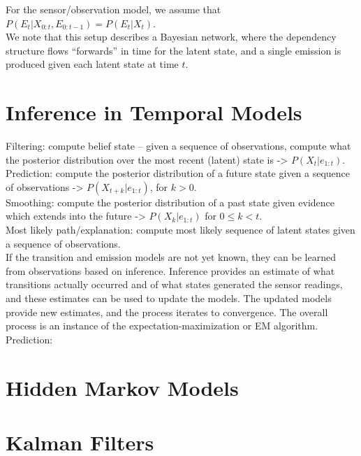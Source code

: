 \documentclass{article}
\begin{document}
\noindent For the sensor/observation model, we assume that $P(E_{t} | X_{0:t}, E_{0:t-1}) = P(E_{t} | X_{t})$.\\

\noindent We note that this setup describes a Bayesian network, where the dependency structure flows
``forwards'' in time for the latent state, and a single emission is produced given each latent state at time $t$.

\section*{Inference in Temporal Models}
Filtering: compute belief state -- given a sequence of observations, compute what the posterior distribution
over the most recent (latent) state is -> $P(X_{t} | e_{1:t})$.\\

\noindent Prediction: compute the posterior distribution of a future state given a sequence of observations ->
$P(X_{t+k} | e_{1:t})$, for $k > 0$.\\

\noindent Smoothing: compute the posterior distribution of a past state given evidence which extends into the future ->
$P(X_{k} | e_{1:t})$ for $0 \leq k < t$.\\

\noindent Most likely path/explanation: compute most likely sequence of latent states given a sequence of observations.\\

\noindent If the transition and emission models are not yet known, they can be learned from observations based on inference.
Inference provides an estimate of what transitions actually occurred and of what states generated the sensor readings, and these estimates
can be used to update the models. The updated models provide new estimates, and the process iterates to convergence.
The overall process is an instance of the expectation-maximization or EM algorithm.\\

\noindent Prediction: 

\section*{Hidden Markov Models}


\section*{Kalman Filters}
\end{document}
